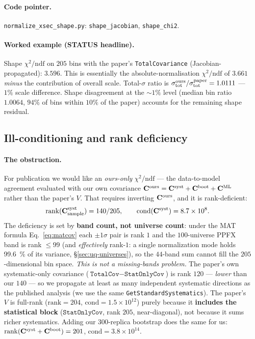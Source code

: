 \paragraph{Code pointer.}
\texttt{normalize\_xsec\_shape.py}: \texttt{shape\_jacobian},
\texttt{shape\_chi2}.

\paragraph{Worked example (STATUS headline).}
Shape $\chi^{2}/\mathrm{ndf}$ on $205$ bins with the paper's
\texttt{TotalCovariance} (Jacobian-propagated): $\boxed{3.596}$.
This is essentially the absolute-normalisation $\chi^{2}/\mathrm{ndf}$
of $3.661$ \emph{minus} the contribution of overall scale. Total-$\sigma$
ratio is $\sigma_{\text{tot}}^{\text{ours}}/\sigma_{\text{tot}}^{\text{paper}} = 1.0111$ ---
$1\%$ scale difference. Shape disagreement at the $\sim 1\%$ level
(median bin ratio $1.0064$, $94\%$ of bins within $10\%$ of the
paper) accounts for the remaining shape residual.

\subsection{Ill-conditioning and rank deficiency}
\label{sec:rank}

\paragraph{The obstruction.}
For publication we would like an \emph{ours-only} $\chi^{2}/\mathrm{ndf}$
--- the data-to-model agreement evaluated with our own covariance
$\mathbf{C}^{\text{ours}} = \mathbf{C}^{\text{syst}} + \mathbf{C}^{\text{boot}} +
\mathbf{C}^{\text{ML}}$ rather than the paper's $V$. That requires inverting
$\mathbf{C}^{\text{ours}}$, and it is rank-deficient:
\begin{equation}
\mathrm{rank}(\mathbf{C}^{\text{syst}}_{\text{sample}}) = 140 / 205,
\qquad
\mathrm{cond}(\mathbf{C}^{\text{syst}}) = 8.7\times10^{8}.
\end{equation}
The deficiency is set by \textbf{band count, not universe count}:
under the MAT formula Eq.~\eqref{eq:matcov} each $\pm1\sigma$ pair is
rank $1$ and the $100$-universe PPFX band is rank $\le 99$ (and
\emph{effectively} rank-$1$: a single normalization mode holds
\SI{99.6}{\percent} of its variance, \S\ref{sec:uq-universes}), so the
$44$-band sum cannot fill the $205$-dimensional bin space. \emph{This is
not a missing-bands problem.} The paper's own systematic-only covariance
($\texttt{TotalCov}-\texttt{StatOnlyCov}$) is rank $120$ --- \emph{lower}
than our $140$ --- so we propagate at least as many independent systematic
directions as the published analysis (we use the same
\texttt{GetStandardSystematics}). The paper's $V$ is full-rank
($\mathrm{rank}=204$, $\mathrm{cond}=1.5\times10^{12}$) purely because it
\textbf{includes the statistical block} ($\texttt{StatOnlyCov}$, rank
$205$, near-diagonal), not because it sums richer systematics. Adding our
$300$-replica bootstrap does the same for us:
$\mathrm{rank}(\mathbf{C}^{\text{syst}}+\mathbf{C}^{\text{boot}})=201$,
$\mathrm{cond}=3.8\times10^{14}$.

